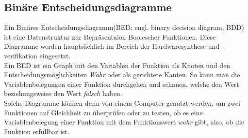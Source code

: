 \subsection{Binäre Entscheidungsdiagramme}
Ein Binäres Entscheidungsdiagramm(BED; engl. binary decision diagram, BDD) ist eine Datenstruktur zur Repräsentaion Boolescher Funktionen. Diese Diagramme werden hauptsächlich im Bereich der Hardwaresynthese und -verifikation eingesetzt.\\
Ein BED ist ein Graph mit den Variablen der Funktion als Knoten und den Entscheidungsmöglichkeiten \textit{Wahr} oder  als gerichtete Kanten. So kann man die Variablenbelegungen einer Funktion durchgehen und schauen, welche den Wert  beziehungsweise den Wert \textit{falsch} haben.\\
Solche Diagramme können dann von einem Computer genutzt werden, um zwei Funktionen auf Gleichheit zu überprüfen oder zu testen, ob es eine Variablenbelegung einer Funktion mit dem Funktionswert \textit{wahr} gibt, also, ob die Funktion erfüllbar ist.

